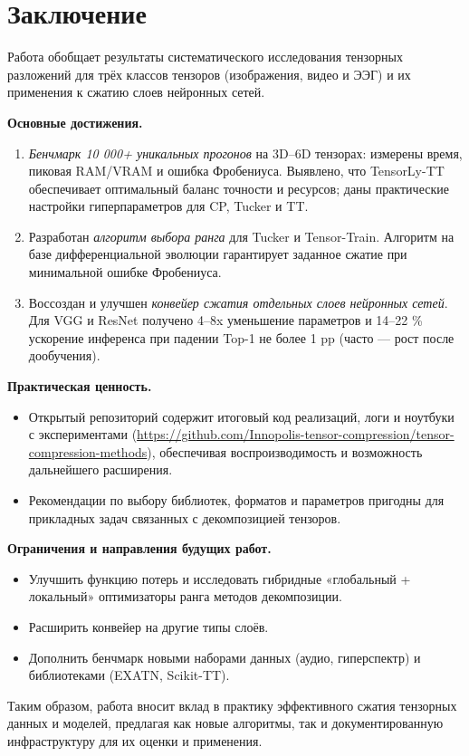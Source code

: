 \chapter{Заключение}
\label{chap:conclusion}

Работа обобщает результаты систематического исследования тензорных разложений для трёх классов тензоров (изображения, видео и ЭЭГ) и их применения к сжатию слоев нейронных сетей.

\textbf{Основные достижения.}
\begin{enumerate}\setlength\itemsep{0.3em}
    \item \emph{Бенчмарк 10 000+ уникальных прогонов} на 3D–6D тензорах: измерены время, пиковая RAM/VRAM и ошибка Фробениуса. Выявлено, что TensorLy-TT обеспечивает оптимальный баланс точности и ресурсов; даны практические настройки гиперпараметров для CP, Tucker и TT.
    \item Разработан \emph{алгоритм выбора ранга} для Tucker и Tensor-Train. Алгоритм на базе дифференциальной эволюции гарантирует заданное сжатие при минимальной ошибке Фробениуса.
    \item Воссоздан и улучшен \emph{конвейер сжатия отдельных слоев нейронных сетей}. Для VGG и ResNet получено 4–8x уменьшение параметров и 14–22 \% ускорение инференса при падении Top-1 не более 1 pp (часто — рост после дообучения).
\end{enumerate}

\textbf{Практическая ценность.}
\begin{itemize}\setlength\itemsep{0.25em}
    \item Открытый репозиторий содержит итоговый код реализаций, логи и ноутбуки с экспериментами (\url{https://github.com/Innopolis-tensor-compression/tensor-compression-methods}), обеспечивая воспроизводимость и возможность дальнейшего расширения.
    \item Рекомендации по выбору библиотек, форматов и параметров пригодны для прикладных задач связанных с декомпозицией тензоров.
\end{itemize}

\textbf{Ограничения и направления будущих работ.}
\begin{itemize}\setlength\itemsep{0.25em}
    \item Улучшить функцию потерь и исследовать гибридные «глобальный + локальный» оптимизаторы ранга методов декомпозиции.
    \item Расширить конвейер на другие типы слоёв.
    \item Дополнить бенчмарк новыми наборами данных (аудио, гиперспектр) и библиотеками (EXATN, Scikit-TT).
\end{itemize}

Таким образом, работа вносит вклад в практику эффективного сжатия тензорных данных и моделей, предлагая как новые алгоритмы, так и документированную инфраструктуру для их оценки и применения.